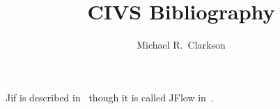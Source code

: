 \documentclass{article}
\title{CIVS Bibliography}
\author{Michael R.~Clarkson}
\begin{document}
\maketitle

Jif is described in~\cite{Myers99,jif,Clarkson10} though it is called
JFlow in~\cite{Myers99}.

\nocite{*}



\end{document}
